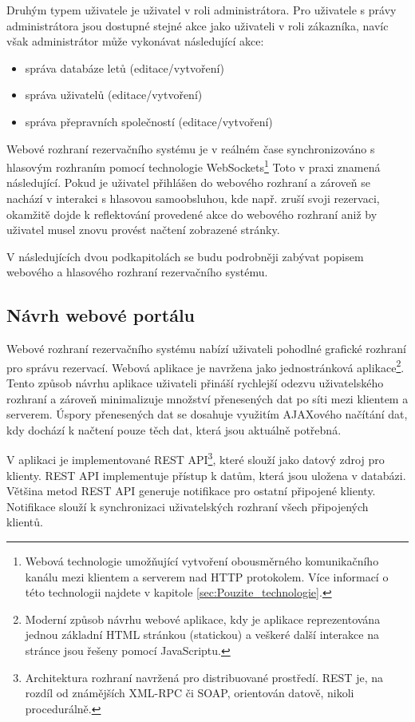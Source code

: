 \documentclass[ing,male,java,dept460]{diploma}						%
\begin{document}
Druhým typem uživatele je uživatel v roli administrátora. Pro uživatele s právy administrátora jsou dostupné stejné akce jako uživateli v roli zákazníka, navíc však administrátor může vykonávat následující akce:

\begin{itemize}
\item správa databáze letů (editace/vytvoření)
\item správa uživatelů (editace/vytvoření)
\item správa přepravních společností (editace/vytvoření)
\end{itemize}

Webové rozhraní rezervačního systému je v reálném čase synchronizováno s hlasovým rozhraním pomocí technologie WebSockets\footnote{Webová technologie umožňující vytvoření obousměrného komunikačního kanálu mezi klientem a serverem nad HTTP protokolem. Více informací o této technologii najdete v kapitole \ref{sec:Pouzite_technologie}.} Toto v praxi znamená následující. Pokud je uživatel přihlášen do webového rozhraní a zároveň se nachází v interakci s hlasovou samoobsluhou, kde např. zruší svoji rezervaci, okamžitě dojde k reflektování provedené akce do webového rozhraní aniž by uživatel musel znovu provést načtení zobrazené stránky.

V následujících dvou podkapitolách se budu podrobněji zabývat popisem webového a hlasového rozhraní rezervačního systému.

\subsection{Návrh webové portálu}
Webové rozhraní rezervačního systému nabízí uživateli pohodlné grafické rozhraní pro správu rezervací. Webová aplikace je navržena jako jednostránková aplikace\footnote{Moderní způsob návrhu webové aplikace, kdy je aplikace reprezentována jednou základní HTML stránkou (statickou) a veškeré další interakce na stránce jsou řešeny pomocí JavaScriptu.}. Tento způsob návrhu aplikace uživateli přináší rychlejší odezvu uživatelského rozhraní a zároveň minimalizuje množství přenesených dat po síti mezi klientem a serverem. Úspory přenesených dat se dosahuje využitím AJAXového načítání dat, kdy dochází k načtení pouze těch dat, která jsou aktuálně potřebná.

V aplikaci je implementované REST API\footnote{Architektura rozhraní navržená pro distribuované prostředí. REST je, na rozdíl od známějších XML-RPC či SOAP, orientován datově, nikoli procedurálně.}, které slouží jako datový zdroj pro klienty. REST API implementuje přístup k datům, která jsou uložena v databázi. Většina metod REST API generuje notifikace pro ostatní připojené klienty. Notifikace slouží k synchronizaci uživatelských rozhraní všech připojených klientů.
\end{document}
